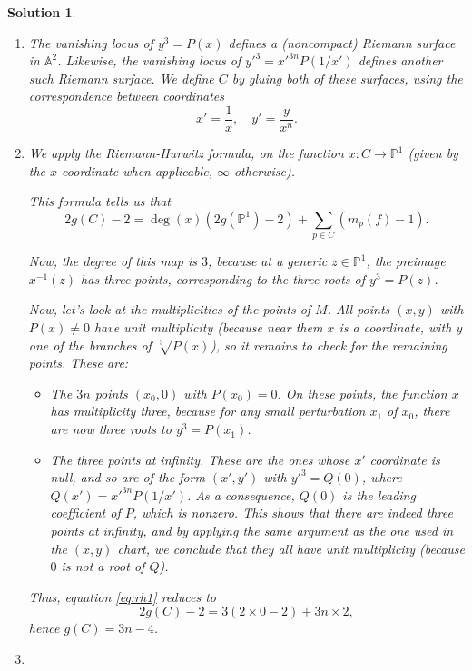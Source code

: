\documentclass{article}
\theoremstyle{nonumberplain}
\newtheorem{sol}{Solution}
\newcommand{\PP}{\mathbb{P}}
\newcommand{\Aff}{\mathbb{A}}
\begin{document}
\begin{sol}
\leavevmode
\begin{enumerate}
\item The vanishing locus of $y^3 = P(x)$ defines a (noncompact) Riemann surface in $\Aff^2$. Likewise, the vanishing locus of $y'^3 = x'^{3n} P(1/x')$ defines another such Riemann surface. We define $C$ by gluing both of these surfaces, using the correspondence between coordinates
\begin{equation}
x' = \frac1x, \quad y' = \frac y{x^n}.
\end{equation}

\item We apply the Riemann-Hurwitz formula, on the function $x \colon C \to \PP^1$ (given by the $x$ coordinate when applicable, $\infty$ otherwise).

This formula tells us that
\begin{equation}\label{eq:rh1}
2 g(C) - 2 = \deg(x) (2 g(\PP^1) - 2) + \sum_{p \in C} (m_p(f) - 1).
\end{equation}

Now, the degree of this map is $3$, because at a generic $z \in \PP^1$, the preimage $x^{-1}(z)$ has three points, corresponding to the three roots of $y^3 = P(z)$. 

Now, let's look at the multiplicities of the points of $M$. All points $(x,y)$ with $P(x) \neq 0$ have unit multiplicity (because near them $x$ is a coordinate, with $y$ one of the branches of $\sqrt[3]{P(x)}$), so it remains to check for the remaining points. These are:
\begin{itemize}
\item The $3n$ points $(x_0,0)$ with $P(x_0) = 0$. On these points, the function $x$ has multiplicity three, because for any small perturbation $x_1$ of $x_0$, there are now three roots to $y^3 = P(x_1)$.

\item The three points at infinity. These are the ones whose $x'$ coordinate is null, and so are of the form $(x',y')$ with $y'^3 = Q(0)$, where $Q(x') = x'^{3n} P(1/x')$. As a consequence, $Q(0)$ is the leading coefficient of $P$, which is nonzero. This shows that there are indeed three points at infinity, and by applying the same argument as the one used in the $(x,y)$ chart, we conclude that they all have unit multiplicity (because $0$ is not a root of $Q$).
\end{itemize}

Thus, equation \eqref{eq:rh1} reduces to
\begin{equation}\label{eq:rh2}
2 g(C) - 2 = 3 (2 \times 0 - 2) + 3n \times 2,
\end{equation}
hence $g(C) = 3n - 4$.

\item
\end{enumerate}
\end{sol}
\end{document}
